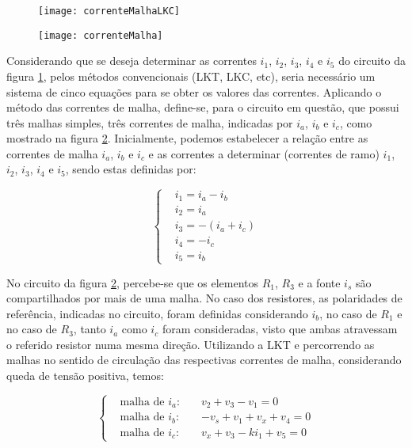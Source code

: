 \documentclass[12pt,fleqn]{book} %
\begin{document}
       \begin{figure}[!htbp] \centering\texttt{[image: correnteMalhaLKC]}
            \caption{}\label{correnteMalhaLKC} 
        \end{figure} 
        \begin{figure}[!htbp] \centering\texttt{[image: correnteMalha]}
            \caption{}\label{correnteMalha} 
        \end{figure} 

\begin{example}[]
Considerando que se deseja determinar as correntes $i_1$, $i_2$, $i_3$, $i_4$ e $i_5$ do circuito da figura \ref{correnteMalhaLKC}, pelos métodos convencionais (LKT, LKC, etc), seria necessário um sistema de cinco equações para se obter os valores das correntes. Aplicando o método das correntes de malha, define-se, para o circuito em questão, que possui três malhas simples, três correntes de malha, indicadas por $i_a$, $i_b$ e $i_c$, como mostrado na figura \ref{correnteMalha}. Inicialmente, podemos estabelecer a relação entre as correntes de malha $i_a$, $i_b$ e $i_c$ e as correntes a determinar (correntes de ramo) $i_1$, $i_2$, $i_3$, $i_4$  e $i_5$, sendo estas definidas por:

\begin{equation}\label{sistemaMalha}
    \left\{\begin{aligned} &           
         i_1=i_a-i_b\\&
i_2=i_a\\&
i_3=-(i_a+i_c)\\&
i_4=-i_c\\&
i_5=i_b
    \end{aligned}\right.
    \end{equation}

No circuito da figura \ref{correnteMalha}, percebe-se que os elementos $R_1$, $R_3$ e a fonte $i_s$ são compartilhados por mais de uma malha. No caso dos resistores, as polaridades de referência, indicadas no circuito, foram definidas considerando $i_b$, no caso de $R_1$ e no caso de $R_3$, tanto $i_a$ como $i_c$ foram consideradas, visto que ambas atravessam o referido resistor numa mesma direção. Utilizando a LKT e percorrendo as malhas no sentido de circulação das respectivas correntes de malha, considerando queda de tensão positiva, temos:

    \begin{equation}\label{sistemaNo}
     \left\{\begin{aligned} & 
        \text{malha de $i_a$: } && v_2+v_3-v_1=0\\& 
        \text{malha de $i_b$: } && -v_s+v_1+v_x+v_4=0\\& 
        \text{malha de $i_c$: } && v_x+v_3-ki_1+v_5=0
    \end{aligned}\right.
    \end{equation}
    

\end{example}
\end{document}
